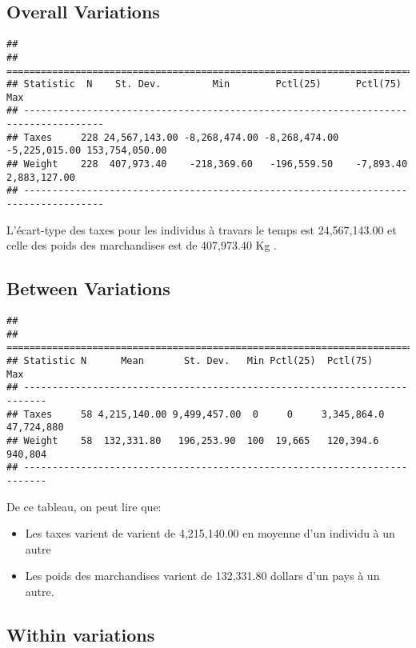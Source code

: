 \documentclass[
]{book}
\providecommand{\tightlist}{%
  \setlength{\itemsep}{0pt}\setlength{\parskip}{0pt}}
\begin{document}
\hypertarget{overall-variations}{%
\subsection{Overall Variations}\label{overall-variations}}

\begin{verbatim}
## 
## ====================================================================================
## Statistic  N    St. Dev.         Min        Pctl(25)      Pctl(75)         Max      
## ------------------------------------------------------------------------------------
## Taxes     228 24,567,143.00 -8,268,474.00 -8,268,474.00 -5,225,015.00 153,754,050.00
## Weight    228  407,973.40    -218,369.60   -196,559.50    -7,893.40    2,883,127.00 
## ------------------------------------------------------------------------------------
\end{verbatim}

L'écart-type des taxes pour les individus à travars le temps est 24,567,143.00 et celle des poids des marchandises est de 407,973.40 Kg .

\hypertarget{between-variations}{%
\subsection{Between Variations}\label{between-variations}}

\begin{verbatim}
## 
## ==========================================================================
## Statistic N      Mean       St. Dev.   Min Pctl(25)  Pctl(75)      Max    
## --------------------------------------------------------------------------
## Taxes     58 4,215,140.00 9,499,457.00  0     0     3,345,864.0 47,724,880
## Weight    58  132,331.80   196,253.90  100  19,665   120,394.6   940,804  
## --------------------------------------------------------------------------
\end{verbatim}

De ce tableau, on peut lire que:

\begin{itemize}
\tightlist
\item
  Les taxes varient de varient de 4,215,140.00 en moyenne d'un individu à un autre
\item
  Les poids des marchandises varient de 132,331.80 dollars d'un pays à un autre.
\end{itemize}

\hypertarget{within-variations}{%
\subsection{Within variations}\label{within-variations}}
\end{document}

